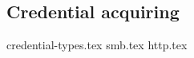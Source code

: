 \documentclass{article}
\begin{document}
\subsection{Credential acquiring}
\label{sec:credential-acquiring}

{credential-types.tex}
{smb.tex}
{http.tex}
\end{document}
